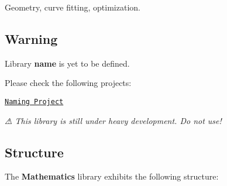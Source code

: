 Geometry, curve fitting, optimization.

\href{https://travis-ci.com/open-space-collective/library-mathematics}{\tt } \href{https://codecov.io/gh/open-space-collective/library-mathematics}{\tt } \href{https://open-space-collective.github.io/library-mathematics}{\tt } \href{https://badge.fury.io/gh/open-space-collective%2Flibrary-mathematics}{\tt } \href{https://badge.fury.io/py/LibraryMathematicsPy}{\tt } \href{https://opensource.org/licenses/Apache-2.0}{\tt }

\subsection*{Warning}

Library {\bfseries name} is yet to be defined.

Please check the following projects\+:


\begin{DoxyItemize}
\item \href{https://github.com/orgs/open-space-collective/projects/1}{\tt Naming Project}
\end{DoxyItemize}

{\itshape ⚠ This library is still under heavy development. Do not use!}

\subsection*{Structure}

The {\bfseries Mathematics} library exhibits the following structure\+:


